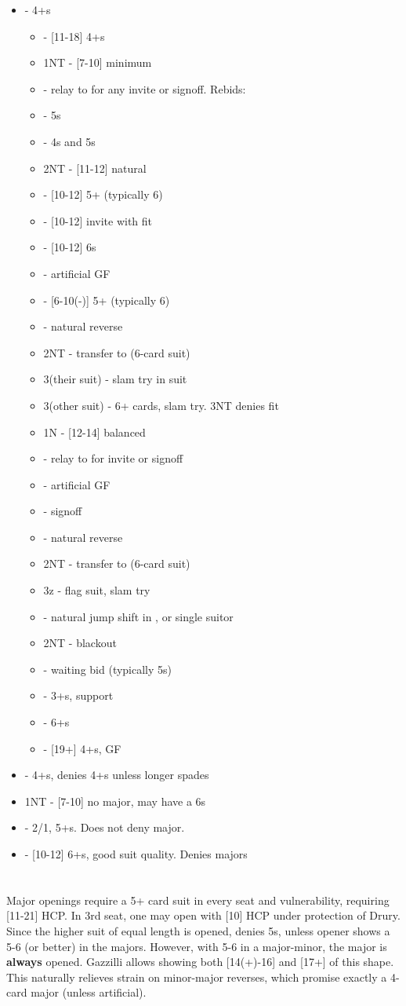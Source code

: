 \documentclass[12pt]{report}
\newcommand{\n}{\\}
\newcommand{\q}[1]{\multido{}{#1}{\qquad}}
\newcommand{\ul}[1]{\begin{itemize}#1\end{itemize}}
\newcommand{\li}[1]{\item[~] \q{#1}}
\newcommand{\bidsection}[2]{\section{\texorpdfstring{#1}{#2}}}
\begin{document}
\begin{center}
    \ul{
        \li0  - 4+\he{}s \ul{
            \li0  - [11-18] 4+\sp{}s
                \li1 1NT - [7-10] minimum
                \li1 \cl2 - relay to \di2 for any invite or signoff.  Rebids:
                    \li2 \he2 - 5\he{}s
                    \li2 \sp2 - 4\sp{}s and 5\he{}s
                    \li2 2NT - [11-12] natural
                    \li2 \cl3 - [10-12] 5+\clubs{} (typically 6)
                    \li2 \di3 - [10-12] invite with fit
                    \li2 \he3 - [10-12] 6\he{}s
                \li1 \di2 - artificial GF
                \li1 \he2 - [6-10(-)] 5+\he{} (typically 6)
                \li1 \sp2 - natural reverse
                \li1 2NT - transfer to \cl3 (6-card suit)
                \li1 3(their suit) - slam try in suit
                \li1 3(other suit) - 6+ cards, slam try.  3NT denies fit
            \li0 1N - [12-14] balanced 
                \li1 \cl2 - relay to \di2 for invite or signoff
                \li1 \di2 - artificial GF
                \li1 \he2 - signoff
                \li1 \sp2 - natural reverse
                \li1 2NT - transfer to \cl3 (6-card suit)
                \li1 3z - flag suit, slam try 
            \li0 \sp2 - natural jump shift in \sp{}, or single suitor 
                \li1 2NT - blackout
                \li1 \cl3{} - waiting bid (typically 5\he{}s)
                \li1 \di3{} - 3+\di{}s, support
                \li1 \he3{} - 6+\he{}s 
            \li0 \cl3 - [19+] 4+\cl{}s, GF
        }

        \li0 \sp1 - 4+\sp{}s, denies 4+\he{}s unless longer spades
        \li0 1NT - [7-10] no major, may have a 6\cl{}s
        \li0 \cl2 - 2/1, 5+\cl{}s.  Does not deny major.
        \li0 \cl3 - [10-12] 6+\cl{}s, good suit quality.  Denies majors
    }

\end{center}

\bidsection{}{1♡} \label{2:4}

    Major openings require a 5+ card suit in every seat and vulnerability, requiring [11-21] HCP.  In 3rd seat, one may open with [10] HCP under protection of  Drury.  \n
    
    Since the higher suit of equal length is opened,  denies 5\sp{}s, unless opener shows a 5-6 (or better) in the majors. However, with 5-6 in a major-minor, the major is \textbf{always} opened.  Gazzilli allows showing both [14(+)-16] and [17+] of this shape.  This naturally relieves strain on minor-major reverses, which promise exactly a 4-card major (unless artificial).\n
\end{document}
